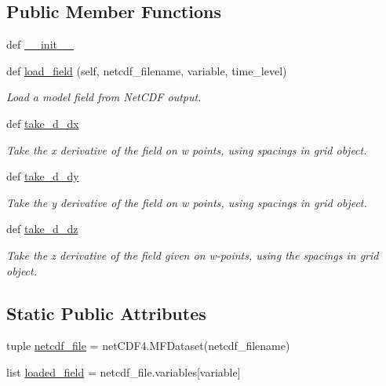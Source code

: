 \subsection*{Public Member Functions}
\begin{DoxyCompactItemize}
\item 
def \hyperlink{classmitgcm_1_1core_1_1Wpoint__field_a5149dd8a1c832999bdbcd60b4abc3b14}{\+\_\+\+\_\+init\+\_\+\+\_\+}
\item 
def \hyperlink{classmitgcm_1_1core_1_1Wpoint__field_ad38c67cd434d445fefbce10393782dd6}{load\+\_\+field} (self, netcdf\+\_\+filename, variable, time\+\_\+level)
\begin{DoxyCompactList}\small\item\em Load a model field from Net\+C\+D\+F output. \end{DoxyCompactList}\item 
def \hyperlink{classmitgcm_1_1core_1_1Wpoint__field_a3dae400759f1828507a317507dbf681b}{take\+\_\+d\+\_\+dx}
\begin{DoxyCompactList}\small\item\em Take the x derivative of the field on w points, using spacings in grid object. \end{DoxyCompactList}\item 
def \hyperlink{classmitgcm_1_1core_1_1Wpoint__field_a3874bb9811b39ed61b25de3ba3e3c39c}{take\+\_\+d\+\_\+dy}
\begin{DoxyCompactList}\small\item\em Take the y derivative of the field on w points, using spacings in grid object. \end{DoxyCompactList}\item 
def \hyperlink{classmitgcm_1_1core_1_1Wpoint__field_a3f7ffb2f1ed512712805bf78d8a8cde4}{take\+\_\+d\+\_\+dz}
\begin{DoxyCompactList}\small\item\em Take the z derivative of the field given on w-\/points, using the spacings in grid object. \end{DoxyCompactList}\end{DoxyCompactItemize}
\subsection*{Static Public Attributes}
\begin{DoxyCompactItemize}
\item 
tuple \hyperlink{classmitgcm_1_1core_1_1Wpoint__field_af9c1d07b6f48ca4ea7fc11f766b406b6}{netcdf\+\_\+file} = net\+C\+D\+F4.\+M\+F\+Dataset(netcdf\+\_\+filename)
\item 
list \hyperlink{classmitgcm_1_1core_1_1Wpoint__field_acfbb89a604280097ac640e55edc60d21}{loaded\+\_\+field} = netcdf\+\_\+file.\+variables\mbox{[}variable\mbox{]}
\end{DoxyCompactItemize}
